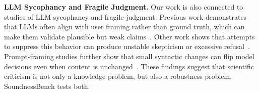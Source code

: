 \textbf{LLM Sycophancy and Fragile Judgment.}
Our work is also connected to studies of LLM sycophancy and fragile judgment. Previous work demonstrates that LLMs often align with user framing rather than ground truth, which can make them validate plausible but weak claims~\citep{sharma2024sycophancy}. Other work shows that attempts to suppress this behavior can produce unstable skepticism or excessive refusal~\citep{causalt5k}. Prompt-framing studies further show that small syntactic changes can flip model decisions even when content is unchanged~\citep{syntacticfragility}. These findings suggest that scientific criticism is not only a knowledge problem, but also a robustness problem. SoundnessBench tests both.